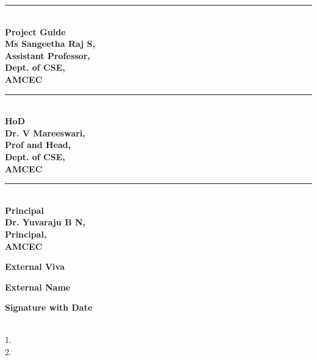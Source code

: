 \documentclass[a4paper, 12pt]{report}
\begin{document}
\vspace{1.5cm}
\noindent
\begin{minipage}[t]{0.32\textwidth}
    \singlespacing
    \centering
    \rule{0.8\linewidth}{0.4pt}\\
    \textbf{Project Guide\\Ms Sangeetha Raj S,\\Assistant Professor,\\Dept. of CSE,\\AMCEC}
\end{minipage}
\hfill
\begin{minipage}[t]{0.32\textwidth}
    \singlespacing
    \centering
    \rule{0.8\linewidth}{0.4pt}\\
    \textbf{HoD\\Dr. V Mareeswari,\\Prof and Head,\\Dept. of CSE,\\AMCEC}
\end{minipage}
\hfill
\begin{minipage}[t]{0.32\textwidth}
    \singlespacing
    \centering
    \rule{0.8\linewidth}{0.4pt}\\
    \textbf{Principal\\Dr. Yuvaraju B N,\\Principal,\\AMCEC}
\end{minipage}

\vspace{0.8cm}   %

\begin{center}
    {\textbf{External Viva}}
\end{center}

\begin{minipage}[t]{0.32\textwidth}
    \centering  
    \textbf{External Name}
\end{minipage}
\hfill
\begin{minipage}[t]{0.32\textwidth}
    \centering
    \textbf{Signature with Date}
\end{minipage}\\[0.2cm]

\begingroup
{}
1.\\[-0.35cm]
2.
\endgroup




\titlespacing*{\chapter}{0pt}{20pt}{10pt}
\setlength{\parindent}{0pt}
\doublespacing
\end{document}
